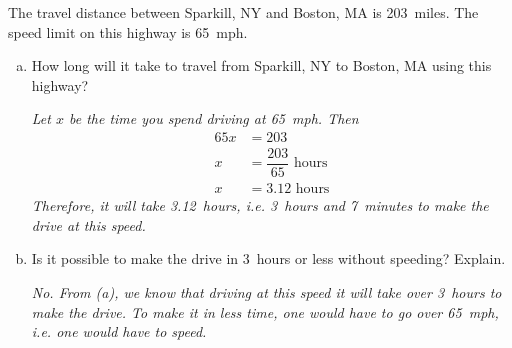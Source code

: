 \documentclass[11pt,letterpaper]{article}
\begin{document}
\newpage





 The travel distance between Sparkill, NY and Boston, MA is 203~miles. The speed limit on this highway is 65~mph. 
\begin{enumerate}[(a)]
\item How long will it take to travel from Sparkill, NY to Boston, MA using this highway? 

{\itshape Let $x$ be the time you spend driving at 65~mph. Then
	\[
	\begin{aligned}
	65x&= 203 \\
	x&= \dfrac{203}{65} \text{ hours} \\
	x&= 3.12 \text{ hours}
	\end{aligned}
	\]
Therefore, it will take 3.12~hours, i.e. 3~hours and 7~minutes to make the drive at this speed.}


\item Is it possible to make the drive in 3~hours or less without speeding? Explain. \pspace

{\itshape No. From (a), we know that driving at this speed it will take over 3~hours to make the drive. To make it in less time, one would have to go over 65~mph, i.e. one would have to speed.}
\end{enumerate} \pvspace{0.6cm}
\end{document}
